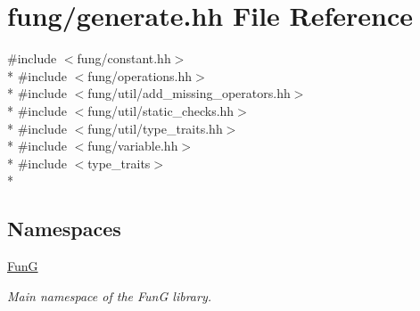 \hypertarget{generate_8hh}{}\section{fung/generate.hh File Reference}
\label{generate_8hh}
{\ttfamily \#include $<$fung/constant.\+hh$>$}\\*
{\ttfamily \#include $<$fung/operations.\+hh$>$}\\*
{\ttfamily \#include $<$fung/util/add\+\_\+missing\+\_\+operators.\+hh$>$}\\*
{\ttfamily \#include $<$fung/util/static\+\_\+checks.\+hh$>$}\\*
{\ttfamily \#include $<$fung/util/type\+\_\+traits.\+hh$>$}\\*
{\ttfamily \#include $<$fung/variable.\+hh$>$}\\*
{\ttfamily \#include $<$type\+\_\+traits$>$}\\*
\subsection*{Namespaces}
\begin{DoxyCompactItemize}
\item 
 \hyperlink{namespaceFunG}{FunG}
\begin{DoxyCompactList}\small\item\em Main namespace of the FunG library. \end{DoxyCompactList}\end{DoxyCompactItemize}
